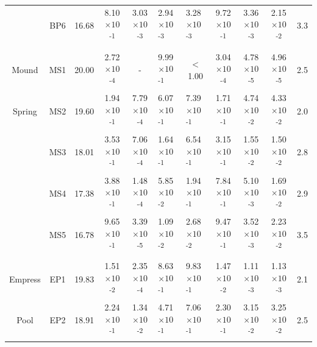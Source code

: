 {\begin{landscape}
\begin{table}
\begin{adjustbox}{width=600pt,keepaspectratio}
\begin{threeparttable}
\begin{tabular}{cccccllcccc}
      & BP6   & 16.68 & 8.10$\times 10$\textsuperscript{-1} & 3.03$\times 10$\textsuperscript{-3} & 2.94$\times 10$\textsuperscript{-3} & 3.28$\times 10$\textsuperscript{-3} & 9.72$\times 10$\textsuperscript{-1} & 3.36$\times 10$\textsuperscript{-3} & 2.15$\times 10$\textsuperscript{-2} & 3.3 \\
      &       &       &       &       &       &       &       &       &       &  \\
Mound & MS1   & 20.00 & 2.72$\times 10$\textsuperscript{-4} & -     & 9.99$\times 10$\textsuperscript{-1} & \multicolumn{1}{c}{$<$ 1.00} & 3.04$\times 10$\textsuperscript{-4} & 4.78$\times 10$\textsuperscript{-5} & 4.96$\times 10$\textsuperscript{-5} & 2.5 \\
Spring & MS2   & 19.60 & 1.94$\times 10$\textsuperscript{-1} & 7.79$\times 10$\textsuperscript{-4} & 6.07$\times 10$\textsuperscript{-1} & 7.39$\times 10$\textsuperscript{-1} & 1.71$\times 10$\textsuperscript{-1} & 4.74$\times 10$\textsuperscript{-2} & 4.33$\times 10$\textsuperscript{-2} & 2.0 \\
      & MS3   & 18.01 & 3.53$\times 10$\textsuperscript{-1} & 7.06$\times 10$\textsuperscript{-4} & 1.64$\times 10$\textsuperscript{-1} & 6.54$\times 10$\textsuperscript{-1} & 3.15$\times 10$\textsuperscript{-1} & 1.55$\times 10$\textsuperscript{-2} & 1.50$\times 10$\textsuperscript{-2} & 2.8 \\
      & MS4   & 17.38 & 3.88$\times 10$\textsuperscript{-1} & 1.48$\times 10$\textsuperscript{-4} & 5.85$\times 10$\textsuperscript{-2} & 1.94$\times 10$\textsuperscript{-1} & 7.84$\times 10$\textsuperscript{-1} & 5.10$\times 10$\textsuperscript{-3} & 1.69$\times 10$\textsuperscript{-2} & 2.9 \\
      & MS5   & 16.78 & 9.65$\times 10$\textsuperscript{-1} & 3.39$\times 10$\textsuperscript{-5} & 1.09$\times 10$\textsuperscript{-2} & 2.68$\times 10$\textsuperscript{-2} & 9.47$\times 10$\textsuperscript{-1} & 3.52$\times 10$\textsuperscript{-3} & 2.23$\times 10$\textsuperscript{-2} & 3.5 \\
      &       &       &       &       &       &       &       &       &       &  \\
Empress & EP1   & 19.83 & 1.51$\times 10$\textsuperscript{-2} & 2.35$\times 10$\textsuperscript{-4} & 8.63$\times 10$\textsuperscript{-1} & 9.83$\times 10$\textsuperscript{-1} & 1.47$\times 10$\textsuperscript{-2} & 1.11$\times 10$\textsuperscript{-3} & 1.13$\times 10$\textsuperscript{-3} & 2.1 \\
Pool  & EP2   & 18.91 & 2.24$\times 10$\textsuperscript{-1} & 1.34$\times 10$\textsuperscript{-2} & 4.71$\times 10$\textsuperscript{-1} & 7.06$\times 10$\textsuperscript{-1} & 2.30$\times 10$\textsuperscript{-1} & 3.15$\times 10$\textsuperscript{-2} & 3.25$\times 10$\textsuperscript{-2} & 2.5 \\

\end{tabular}
\end{threeparttable}
\end{adjustbox}
\end{table}
\end{landscape}}
